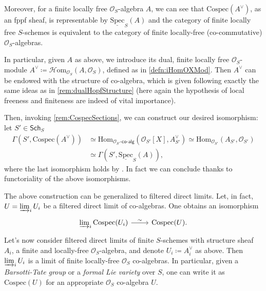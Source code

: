 \documentclass[../Main]{subfiles}
\begin{document}
\begin{rem}[]
	Moreover, for a finite locally free $\mathcal{O}_{ S }$-algebra $A$,
	we can see that $\mathrm{Cospec}(A^{\vee})$, as an fppf sheaf, is representable 
	by $\underline{\mathrm{Spec}}_S(A)$ and
	the category of finite locally free $S$-schemes
	is equivalent to the category of finite locally-free (co-commutative)
	$\mathcal{O}_{ S }$-algebras.

	In particular, given $A$ as above, we introduce its dual,
	finite locally free $\mathcal{O}_{ S }$-module 
	$A^{\vee} \coloneqq \mathcal{H}\mathrm{om}_{\mathcal{O}_{ S }} \left( A, \mathcal{O}_{ S } \right)$,
	defined as in \cref{defn:iHomOXMod}. 
	Then $A^{\vee}$ can be endowed with the structure of co-algebra, which is
	given following exactly the same ideas as in \cref{rem:dualHopfStructure}
	(here again the hypothesis of local freeness and finiteness are indeed
	of vital importance).

	Then, invoking \cref{rem:CospecSections}, we can construct 
	our desired isomorphism: let $S' \in \mathsf{Sch}_{ S }$
	\begin{align*}
		\Gamma(S', \mathrm{Cospec}(A^{\vee})) &\simeq
		\mathrm{Hom}_{ \mathcal{O}_{ S' }\text{-}\mathsf{co}\text{-}\mathsf{alg}} 
		\left( \mathcal{O}_{ S' }[X], A^\vee_{S'} \right) \simeq
		\mathrm{Hom}_{ \mathcal{O}_{ S' }}
		\left( A_{S'}, \mathcal{O}_{ S' } \right) \\
		&\simeq
		\Gamma(S', \underline{\mathrm{Spec}}_S(A))
	,\end{align*}
	where the last isomorphism holds by 
	\cite[\href{https://stacks.math.columbia.edu/tag/01LV}{Lemma 01LV}]{SP}.
	In fact we can conclude thanks to functoriality of the above isomorphisms.
\end{rem}


\begin{rem}
	The above construction can be generalized to
	filtered direct limits.
	Let, in fact, $U = \varinjlim_i U_i$ be a filtered direct limit
	of co-algebras. One obtains an isomorphism
	\begin{equation*}
	\begin{tikzcd}[row sep = 0ex
		,/tikz/column 1/.append style={anchor=base east}
		,/tikz/column 2/.append style={anchor=base west}]
		\varinjlim_i \mathrm{Cospec}(U_i) \arrow[r, "\sim", rightarrow] &
		\mathrm{Cospec}(U)
	.\end{tikzcd}
	\end{equation*} 
	Let's now consider filtered direct limits of 
	finite $S$-schemes with structure sheaf $A_i$,
	a finite and locally-free $\mathcal{O}_{ S }$-algebra, 
	and denote $U_i \coloneqq A_i^\vee$ as above.
	Then $\varinjlim_i U_i$ is a limit 
	of finite locally-free $\mathcal{O}_{ S }$ co-algebras.
	In particular, given a {\em Barsotti-Tate group} or a {\em formal Lie variety}
	over $S$, one can write it as $\mathrm{Cospec}(U)$ for an appropriate 
	$\mathcal{O}_{ S }$ co-algebra $U$.
\end{rem}
\end{document}
